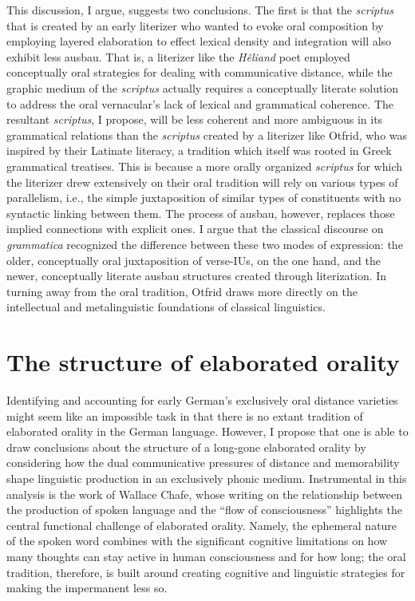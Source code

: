 This discussion, I argue, suggests two conclusions. The first is that the \textit{scriptus} that is created by an early literizer who wanted to evoke oral composition by employing layered elaboration to effect lexical density and integration will also exhibit less ausbau. That is, a literizer like the \textit{Hêliand} poet employed conceptually oral strategies for dealing with communicative distance, while the graphic medium of the \textit{scriptus} actually requires a conceptually literate solution to address the oral vernacular’s lack of lexical and grammatical coherence. The resultant \textit{scriptus}, I propose, will be less coherent and more ambiguous in its grammatical relations than the \textit{scriptus} created by a literizer like Otfrid, who was inspired by their Latinate literacy, a tradition which itself was rooted in Greek grammatical treatises. This is because a more orally organized \textit{scriptus} for which the literizer drew extensively on their oral tradition will rely on various types of parallelism, i.e., the simple juxtaposition of similar types of constituents with no syntactic linking between them. The process of ausbau, however, replaces those implied connections with explicit ones. I argue that the classical discourse on \textit{grammatica} recognized the difference between these two modes of expression: the older, conceptually oral juxtaposition of verse-IUs, on the one hand, and the newer, conceptually literate ausbau structures created through literization. In turning away from the oral tradition, Otfrid draws more directly on the intellectual and metalinguistic foundations of classical linguistics.

\section{The structure of elaborated orality }\label{sec:6.1}

Identifying and accounting for early German’s exclusively oral distance varieties might seem like an impossible task in that there is no extant tradition of elaborated orality in the German language. However, I propose that one is able to draw conclusions about the structure of a long-gone elaborated orality by considering how the dual communicative pressures of distance and memorability shape linguistic production in an exclusively phonic medium. Instrumental in this analysis is the work of Wallace Chafe, whose writing on the relationship between the production of spoken language and the “flow of consciousness” highlights the central functional challenge of elaborated orality. Namely, the ephemeral nature of the spoken word combines with the significant cognitive limitations on how many thoughts can stay active in human consciousness and for how long; the oral tradition, therefore, is built around creating cognitive and linguistic strategies for making the impermanent less so.

